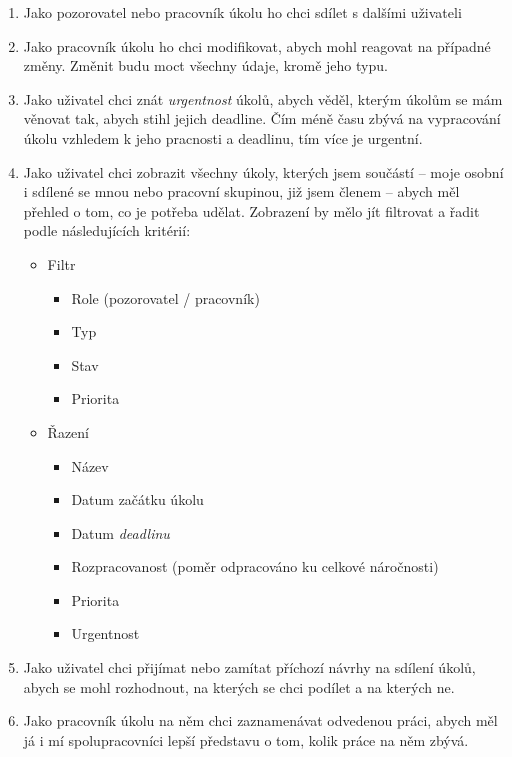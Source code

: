 \documentclass[thesis=B,czech]{FITthesis}[2012/06/26]
\begin{document}
\begin{enumerate}
\begin{enumerate}
				\item Jako pozorovatel nebo pracovník úkolu ho chci sdílet s dalšími uživateli 
				
				\item Jako pracovník úkolu ho chci modifikovat, abych mohl reagovat na případné změny. Změnit budu moct všechny údaje, kromě jeho typu.
				
				\item Jako uživatel chci znát \textit{urgentnost} úkolů, abych věděl, kterým úkolům se mám věnovat tak, abych stihl jejich deadline. Čím méně času zbývá na vypracování úkolu vzhledem k jeho pracnosti a deadlinu, tím více je urgentní.
				
				\item Jako uživatel chci zobrazit všechny úkoly, kterých jsem součástí -- moje osobní i sdílené se mnou nebo pracovní skupinou, již jsem členem -- abych měl přehled o tom, co je potřeba udělat. Zobrazení by mělo jít filtrovat a řadit podle následujících kritérií:
				\begin{itemize}
					\item Filtr
					\begin{itemize}
						\item Role (pozorovatel / pracovník)
						\item Typ
						\item Stav
						\item Priorita
					\end{itemize}
					\item Řazení
					\begin{itemize}
						\item Název
						\item Datum začátku úkolu
						\item Datum \textit{deadlinu}
						\item Rozpracovanost (poměr odpracováno ku celkové náročnosti)
						\item Priorita
						\item Urgentnost
					\end{itemize}
				\end{itemize}
				
				\item Jako uživatel chci přijímat nebo zamítat příchozí návrhy na sdílení úkolů, abych se mohl rozhodnout, na kterých se chci podílet a na kterých ne.
				
				\item Jako pracovník úkolu na něm chci zaznamenávat odvedenou práci, abych měl já i mí spolupracovníci lepší představu o tom, kolik práce na něm zbývá.
				

\end{enumerate}
\end{enumerate}
\end{document}

